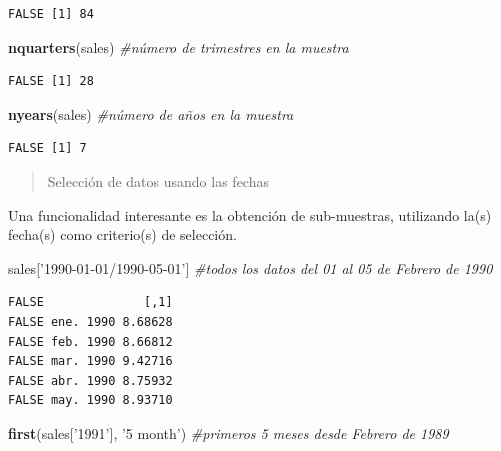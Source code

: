 \documentclass[]{book}
\newenvironment{Shaded}{\begin{snugshade}}{\end{snugshade}}
\newcommand{\CommentTok}[1]{\textcolor[rgb]{0.56,0.35,0.01}{\textit{#1}}}
\newcommand{\KeywordTok}[1]{\textcolor[rgb]{0.13,0.29,0.53}{\textbf{#1}}}
\newcommand{\NormalTok}[1]{#1}
\newcommand{\StringTok}[1]{\textcolor[rgb]{0.31,0.60,0.02}{#1}}
\begin{document}
\begin{verbatim}
FALSE [1] 84
\end{verbatim}

\begin{Shaded}
\begin{Highlighting}[]
\KeywordTok{nquarters}\NormalTok{(sales) }\CommentTok{#número de trimestres en la muestra}
\end{Highlighting}
\end{Shaded}

\begin{verbatim}
FALSE [1] 28
\end{verbatim}

\begin{Shaded}
\begin{Highlighting}[]
\KeywordTok{nyears}\NormalTok{(sales) }\CommentTok{#número de años en la muestra}
\end{Highlighting}
\end{Shaded}

\begin{verbatim}
FALSE [1] 7
\end{verbatim}

\begin{quote}
Selección de datos usando las fechas
\end{quote}

Una funcionalidad interesante es la obtención de sub-muestras, utilizando la(s) fecha(s) como criterio(s) de selección.

\begin{Shaded}
\begin{Highlighting}[]
\NormalTok{sales[}\StringTok{'1990-01-01/1990-05-01'}\NormalTok{] }\CommentTok{#todos los datos del 01 al 05 de Febrero de 1990}
\end{Highlighting}
\end{Shaded}

\begin{verbatim}
FALSE              [,1]
FALSE ene. 1990 8.68628
FALSE feb. 1990 8.66812
FALSE mar. 1990 9.42716
FALSE abr. 1990 8.75932
FALSE may. 1990 8.93710
\end{verbatim}

\begin{Shaded}
\begin{Highlighting}[]
\KeywordTok{first}\NormalTok{(sales[}\StringTok{'1991'}\NormalTok{], }\StringTok{'5 month'}\NormalTok{) }\CommentTok{#primeros 5 meses desde Febrero de 1989}
\end{Highlighting}
\end{Shaded}
\end{document}
